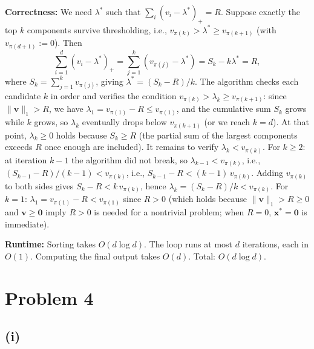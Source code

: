 \documentclass[12pt]{article}
\begin{document}
\textbf{Correctness:} We need $\lambda^*$ such that $\sum_i (v_i - \lambda^*)_+ = R$. Suppose exactly the top $k$ components survive thresholding, i.e., $v_{\pi(k)} > \lambda^* \geq v_{\pi(k+1)}$ (with $v_{\pi(d+1)} := 0$). Then
\[
\sum_{i=1}^d (v_i - \lambda^*)_+ = \sum_{j=1}^k (v_{\pi(j)} - \lambda^*) = S_k - k\lambda^* = R,
\]
where $S_k = \sum_{j=1}^k v_{\pi(j)}$, giving $\lambda^* = (S_k - R)/k$. The algorithm checks each candidate $k$ in order and verifies the condition $v_{\pi(k)} > \lambda_k \geq v_{\pi(k+1)}$: since $\|\mathbf{v}\|_1 > R$, we have $\lambda_1 = v_{\pi(1)} - R \leq v_{\pi(1)}$, and the cumulative sum $S_k$ grows while $k$ grows, so $\lambda_k$ eventually drops below $v_{\pi(k+1)}$ (or we reach $k = d$). At that point, $\lambda_k \geq 0$ holds because $S_k \geq R$ (the partial sum of the largest components exceeds $R$ once enough are included). It remains to verify $\lambda_k < v_{\pi(k)}$. For $k \geq 2$: at iteration $k-1$ the algorithm did not break, so $\lambda_{k-1} < v_{\pi(k)}$, i.e., $(S_{k-1} - R)/(k-1) < v_{\pi(k)}$, i.e., $S_{k-1} - R < (k-1)\,v_{\pi(k)}$. Adding $v_{\pi(k)}$ to both sides gives $S_k - R < k\,v_{\pi(k)}$, hence $\lambda_k = (S_k - R)/k < v_{\pi(k)}$. For $k = 1$: $\lambda_1 = v_{\pi(1)} - R < v_{\pi(1)}$ since $R > 0$ (which holds because $\|\mathbf{v}\|_1 > R \geq 0$ and $\mathbf{v} \geq \mathbf{0}$ imply $R > 0$ is needed for a nontrivial problem; when $R = 0$, $\mathbf{x}^* = \mathbf{0}$ is immediate).

\textbf{Runtime:} Sorting takes $O(d \log d)$. The loop runs at most $d$ iterations, each in $O(1)$. Computing the final output takes $O(d)$. Total: $O(d \log d)$.

\section*{Problem 4}

\subsection*{(i)}
\end{document}
